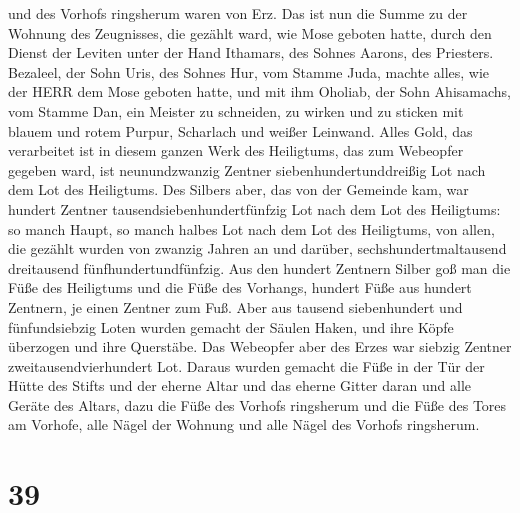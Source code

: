 und des Vorhofs ringsherum waren von Erz.  Das ist nun die
Summe zu der Wohnung des Zeugnisses, die gezählt ward, wie Mose geboten
hatte, durch den Dienst der Leviten unter der Hand Ithamars, des Sohnes
Aarons, des Priesters.  Bezaleel, der Sohn Uris, des Sohnes
Hur, vom Stamme Juda, machte alles, wie der HERR dem Mose geboten hatte,
 und mit ihm Oholiab, der Sohn Ahisamachs, vom Stamme Dan,
ein Meister zu schneiden, zu wirken und zu sticken mit blauem und rotem
Purpur, Scharlach und weißer Leinwand.  Alles Gold, das
verarbeitet ist in diesem ganzen Werk des Heiligtums, das zum Webeopfer
gegeben ward, ist neunundzwanzig Zentner siebenhundertunddreißig Lot
nach dem Lot des Heiligtums.  Des Silbers aber, das von der
Gemeinde kam, war hundert Zentner tausendsiebenhundertfünfzig Lot nach
dem Lot des Heiligtums:  so manch Haupt, so manch halbes
Lot nach dem Lot des Heiligtums, von allen, die gezählt wurden von
zwanzig Jahren an und darüber, sechshundertmaltausend dreitausend
fünfhundertundfünfzig.  Aus den hundert Zentnern Silber goß
man die Füße des Heiligtums und die Füße des Vorhangs, hundert Füße aus
hundert Zentnern, je einen Zentner zum Fuß.  Aber aus
tausend siebenhundert und fünfundsiebzig Loten wurden gemacht der Säulen
Haken, und ihre Köpfe überzogen und ihre Querstäbe.  Das
Webeopfer aber des Erzes war siebzig Zentner zweitausendvierhundert Lot.
 Daraus wurden gemacht die Füße in der Tür der Hütte des
Stifts und der eherne Altar und das eherne Gitter daran und alle Geräte
des Altars,  dazu die Füße des Vorhofs ringsherum und die
Füße des Tores am Vorhofe, alle Nägel der Wohnung und alle Nägel des
Vorhofs ringsherum.

\hypertarget{section-38}{%
\section{39}\label{section-38}}

